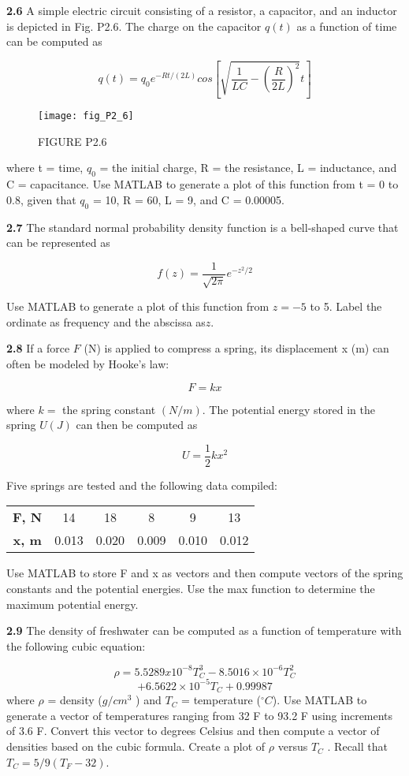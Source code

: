 \documentclass[../main.tex]{subfiles}
\begin{document}
\begin{multicols}{2}
\textbf{2.6} A simple electric circuit consisting of a resistor, a capacitor, and an inductor is depicted in Fig. P2.6. The charge
on the capacitor $q(t)$ as a function of time can be computed
as

$$q(t)=q_0e^{-Rt/(2L)}cos \left[\sqrt{ \dfrac{1}{LC}-\left(\dfrac{R}{2L} \right)^2 }t\right]$$


\begin{figure}[H]
	\centering
	\texttt{[image: fig\_P2\_6]}
   \caption*{\textsf{FIGURE P2.6}}
   
\end{figure}

where t = time, $q_0$ = the initial charge, R = the resistance,
L = inductance, and C = capacitance. Use MATLAB to
generate a plot of this function from t = 0 to 0.8, given that
$q_0$ = 10, R = 60, L = 9, and C = 0.00005.


\textbf{2.7} The standard normal probability density function is a
bell-shaped curve that can be represented as

$$f(z)=\dfrac{1}{\sqrt{2\pi}}e^{-z^2/2} $$

Use MATLAB to generate a plot of this function from
$z = -5$ to 5. Label the ordinate as frequency and the abscissa as$ z$.


\textbf{2.8} If a force $F$ (N) is applied to compress a spring, its displacement x (m) can often be modeled by Hooke's law:

$$F=kx $$


where $k =$ the spring constant $(N/m)$. The potential energy
stored in the spring $U (J)$ can then be computed as


$$U=\dfrac{1}{2}kx^2 $$

Five springs are tested and the following data compiled:

\begin{tabular}{cccccc}
	\hline
	\textbf{F, N} &14 &18& 8 &9& 13\\
	\textbf{x, m}& 0.013 &0.020& 0.009& 0.010& 0.012\\
	\hline
	
\end{tabular}
Use MATLAB to store F and x as vectors and then compute
vectors of the spring constants and the potential energies.
Use the max function to determine the maximum potential
energy.


\textbf{2.9} The density of freshwater can be computed as a function
of temperature with the following cubic equation:


$$ \rho =5.5289x10^{-8}T_C^3-8.5016 \times 10^{-6}T_C^2 $$
$$+6.5622 \times 10^{-5}T_C+0.99987$$
where $\rho$ = density ($g/cm^3$
) and $T_C$ = temperature ($^{\circ} C$). Use
MATLAB to generate a vector of temperatures ranging from
32 F to 93.2 F using increments of 3.6 F. Convert this vector to degrees Celsius and then compute a vector of densities
based on the cubic formula. Create a plot of $\rho$ versus $T_C$ .
Recall that $T_C = 5/9(T_F - 32)$.



\end{multicols}
\end{document}
